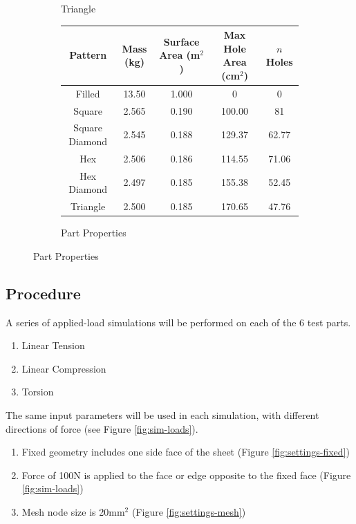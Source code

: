 \documentclass[12pt, letterpaper]{article}
\begin{document}
\begin{figure}[H]
\begin{subfigure}[b]{.3\linewidth}
		\caption{Triangle}
	\end{subfigure}
	\begin{subfigure}[b]{\linewidth}
	\begingroup
	\setlength{\tabcolsep}{10pt} %
	\renewcommand{\arraystretch}{1.5} %
		\begin{tabular}{ | c | c | c | c | c | }\hline
			Pattern 			& Mass (kg) 	& Surface Area (m$^2$)	& Max Hole Area (cm$^2$) 	& $n$ Holes 	\\\hline
			Filled				& 13.50 		& 1.000 						& 0			 					& 0			\\\hline
			Square			& 2.565 		& 0.190 						& 100.00		 					& 81			\\\hline
			Square Diamond	& 2.545 		& 0.188 						& 129.37	 						& 62.77		\\\hline
			Hex				& 2.506 		& 0.186 						& 114.55	 						& 71.06		\\\hline
			Hex Diamond		& 2.497 		& 0.185 						& 155.38	 						& 52.45		\\\hline
			Triangle			& 2.500 		& 0.185						& 170.65				 			& 47.76		\\\hline
		\end{tabular}
		\caption{Part Properties}
	\endgroup
	\end{subfigure}
\end{figure}

\newpage
\subsection{Procedure}
\label{sec:procedure}

A series of applied-load simulations will be performed on each of the 6 test parts. 

\begin{enumerate}
\item Linear Tension
\item Linear Compression
\item Torsion
\end{enumerate}

The same input parameters will be used in each simulation, with different directions of force (see Figure \ref{fig:sim-loads}). 

\begin{enumerate}
\item Fixed geometry includes one side face of the sheet (Figure \ref{fig:settings-fixed})
\item Force of 100N is applied to the face or edge opposite to the fixed face (Figure \ref{fig:sim-loads})
\item Mesh node size is 20mm$^2$ (Figure \ref{fig:settings-mesh})
\end{enumerate}
\end{document}
